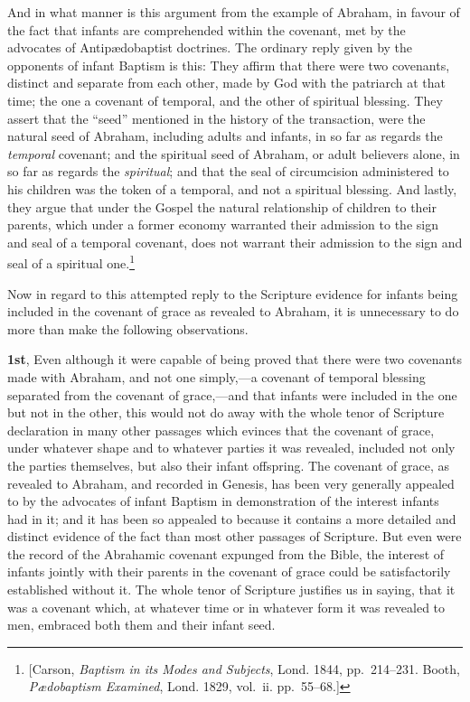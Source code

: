 \documentclass[
]{book}
\begin{document}
And in what manner is this argument from the example of Abraham, in favour of the fact that infants are comprehended within the covenant, met by the advocates of Antipædobaptist doctrines. The ordinary reply given by the opponents of infant Baptism is this: They affirm that there were two covenants, distinct and separate from each other, made by God with the patriarch at that time; the one a covenant of temporal, and the other of spiritual blessing. They assert that the ``seed'' mentioned in the history of the transaction, were the natural seed of Abraham, including adults and infants, in so far as regards the \emph{temporal} covenant; and the spiritual seed of Abraham, or adult believers alone, in so far as regards the \emph{spiritual}; and that the seal of circumcision administered to his children was the token of a temporal, and not a spiritual blessing. And lastly, they argue that under the Gospel the natural relationship of children to their parents, which under a former economy warranted their admission to the sign and seal of a temporal covenant, does not warrant their admission to the sign and seal of a spiritual one.\footnote{{[}Carson, \emph{Baptism in its Modes and Subjects}, Lond. 1844, pp.~214--231. Booth, \emph{Pædobaptism Examined}, Lond. 1829, vol.~ii. pp.~55--68.{]}}

Now in regard to this attempted reply to the Scripture evidence for infants being included in the covenant of grace as revealed to Abraham, it is unnecessary to do more than make the following observations.

\textbf{1st}, Even although it were capable of being proved that there were two covenants made with Abraham, and not one simply,---a covenant of temporal blessing separated from the covenant of grace,---and that infants were included in the one but not in the other, this would not do away with the whole tenor of Scripture declaration in many other passages which evinces that the covenant of grace, under whatever shape and to whatever parties it was revealed, included not only the parties themselves, but also their infant offspring. The covenant of grace, as revealed to Abraham, and recorded in Genesis, has been very generally appealed to by the advocates of infant Baptism in demonstration of the interest infants had in it; and it has been so appealed to because it contains a more detailed and distinct evidence of the fact than most other passages of Scripture. But even were the record of the Abrahamic covenant expunged from the Bible, the interest of infants jointly with their parents in the covenant of grace could be satisfactorily established without it. The whole tenor of Scripture justifies us in saying, that it was a covenant which, at whatever time or in whatever form it was revealed to men, embraced both them and their infant seed.
\end{document}
